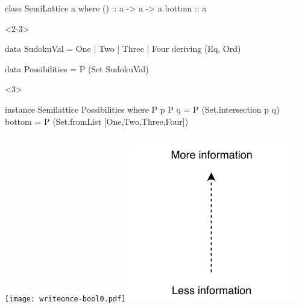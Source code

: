 \documentclass[UKenglish,usenames,dvipsnames,svgnames,table,aspectratio=169,mathserif]{beamer}
\newcommand{\nl}{\vspace{\baselineskip}}
\begin{document}
\begin{frame}[fragile]

\begin{overlayarea}{\textwidth}{0.5\textheight}
\begin{haskellcode}
class SemiLattice a where
  (\/)   :: a -> a -> a
  bottom :: a
\end{haskellcode}
\nl

\begin{onlyenv}<2-3>
\begin{haskellcode}
data SudokuVal = One | Two | Three | Four
  deriving (Eq, Ord)

data Possibilities = P (Set SudokuVal)
\end{haskellcode}
\end{onlyenv}
\nl
\begin{onlyenv}<3>
\begin{haskellcode}
instance Semilattice Possibilities where
  P p \/ P q = P (Set.intersection p q)
  bottom = P (Set.fromList [One,Two,Three,Four])
\end{haskellcode}
\end{onlyenv}
\end{overlayarea}
\end{frame}


\begin{frame}
\begin{columns}
\texttt{[image: writeonce-bool0.pdf]}
\includegraphics[scale=1.3]{set/more-info.pdf}
\end{columns}
\end{frame}
\end{document}
